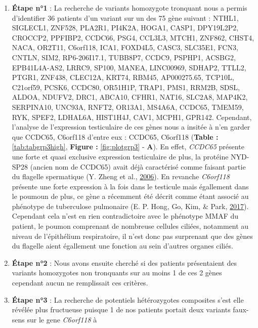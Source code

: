 \documentclass[12pt,twoside]{reedthesis}
\theoremstyle{definition}
\theoremstyle{definition}
\theoremstyle{remark}
\begin{document}
  \begin{enumerate}
  \def\labelenumi{\arabic{enumi}.}
  \item
    \textbf{Étape n°1} : La recherche de variants homozygote tronquant
    nous a permis d'identifier 36 patients d'un variant sur un des 75 gène
    suivant : NTHL1, SIGLECL1, ZNF528, PLA2R1, PI4K2A, HOGA1, CASP1,
    DPY19L2P2, CROCCP2, PPFIBP2, CCDC66, PSG4, CCL3L3, MTCH1, ZNF862,
    CHST4, NACA, OR2T11, C6orf118, ICA1, FOXD4L5, CASC3, SLC35E1, FCN3,
    CNTLN, SIM2, RP6-206I17.1, TUBB8P7, CCDC9, PSPHP1, ACSBG2,
    EPB41L4A-AS2, LRRC9, SP100, MANEA, LINC00969, SDHAP2, TTLL2, PTGR1,
    ZNF438, CLEC12A, KRT74, RBM45, AP000275.65, TCP10L, C21orf59, PCSK6,
    CCDC80, OR51H1P, TRAP1, PMS1, RRM2B, SDSL, ALDOA, NDUFV2, DRC1,
    ABCA10, CFHR1, NAT16, SLC2A8, MAP4K2, SERPINA10, UNC93A, RNFT2,
    OR13A1, MS4A6A, CCDC65, TMEM59, RYK, SPEF2, LDHAL6A, HIST1H4J, CAV1,
    MCPH1, GPR142. Cependant, l'analyse de l'expression testiculaire de
    ces gènes nous a insitée à n'en garder que CCDC65, C6orf118 d'entre
    eux : CCDC65, C6orf118 (\textbf{Table :} \ref{tab:tabgrp3high},
    \textbf{Figure :} \ref{fig:plotgrp3} - \textbf{A}). En effet,
    \emph{CCDC65} présente une forte et quasi exclusive expression
    testiculaire de plus, la protéine NYD-SP28 (ancien nom de CCDC65)
    avait déjà caractérisé comme faisant partie du flagelle spermatique
    (Y. Zheng et al., \protect\hyperlink{ref-Zheng2006}{2006}). En
    revanche \emph{C6orf118} présente une forte expression à la fois dans
    le testicule mais égallement dans le poumoun de plus, ce gène a
    récemment été décrit comme étant associé au phénotype de tuberculose
    pulmonaire (E. P. Hong, Go, Kim, \& Park,
    \protect\hyperlink{ref-Hong2017}{2017}). Cependant cela n'est en rien
    contradictoire avec le phénotype MMAF du patient, le poumon comprenant
    de nombreuse cellules ciliées, notamment au niveau de l'épithélium
    respiratoire, il n'est donc pas surprenant que des gènes du flagelle
    aient égallement une fonction au sein d'autres organes ciliés.
  \item
    \textbf{Étape n°2} : Nous avons ensuite cherché si des patients
    présentaient des variants homozygotes non tronquants sur au moins 1 de
    ces 2 gènes cependant aucun ne remplissait ces critères.
  \item
    \textbf{Étape n°3} : La recherche de potentiels hétérozygotes
    composites s'est elle révélée plus fructueuse puisque 1 de nos
    patients portait deux variants faux-sens sur le gene \emph{C6orf118} à

\end{enumerate}
\end{document}
